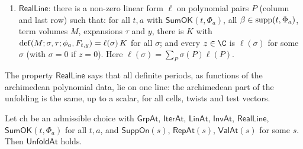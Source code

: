 \begin{definition}
\begin{enumerate}[label=(\alph*)]
\item $\mathsf{RealLine}$: there is a non-zero linear form $\ell$ on polynomial pairs $P$ (column and last row) such that:
for all $t,a$ with $\mathsf{SumOK}(t,\Phi_a)$, all $\beta\in\mathrm{supp}(t,\Phi_a)$, term volumes $M$, expansions $\tau$ and
$y$, there is $K$ with $\mathrm{def}(M;\sigma,\tau;\phi_a,F_{t,y})=\ell(\sigma)\,K$ for all $\sigma$; and every $z\in\C$ is
$\ell(\sigma)$ for some $\sigma$ (with $\sigma=0$ if $z=0$). Here $\ell(\sigma)=\sum_P\sigma(P)\ell(P)$.
\end{enumerate}
\end{definition}

The property $\mathsf{RealLine}$ says that all definite periods, as functions of the archimedean polynomial data, lie on
one line: the archimedean part of the unfolding is the same, up to a scalar, for all cells, twists and test vectors.

\begin{proposition}\label{pf:rowprops:unfoldAt}
Let $\mathrm{ch}$ be an admissible choice with $\mathsf{GrpAt}$, $\mathsf{IterAt}$, $\mathsf{LinAt}$, $\mathsf{InvAt}$,
$\mathsf{RealLine}$, $\mathsf{SumOK}(t,\Phi_a)$ for all $t,a$, and $\mathsf{SuppOn}(s)$, $\mathsf{RepAt}(s)$,
$\mathsf{ValAt}(s)$ for some $s$. Then $\mathsf{UnfoldAt}$ holds.
\end{proposition}

